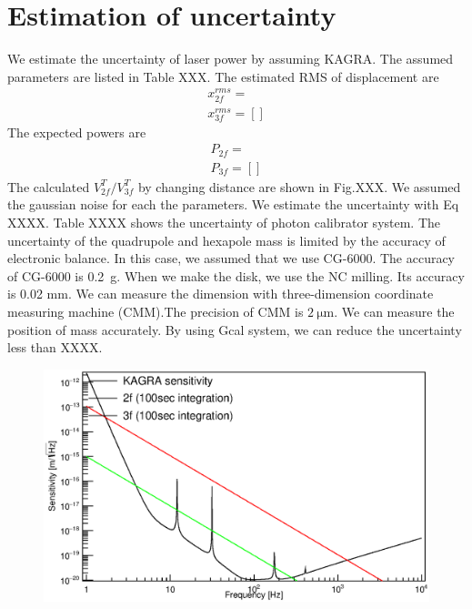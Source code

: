 \documentclass[12pt]{iopart}
\begin{document}
\section{Estimation of uncertainty}
We estimate the uncertainty of laser power by assuming KAGRA. The assumed parameters are listed in Table XXX. The estimated RMS of displacement are 
\begin{eqnarray}
x^{rms}_{2f}=\\
x^{rms}_{3f}= []
\end{eqnarray}
The expected powers are
\begin{eqnarray}
P_{2f}=\\
P_{3f}= []
\end{eqnarray}
The calculated $V^T_{2f}/V^{T}_{3f}$ by changing distance are shown in Fig.XXX.
We assumed the gaussian noise for each the parameters. We estimate the uncertainty with Eq XXXX. Table XXXX shows the uncertainty of  photon calibrator system. The uncertainty of the quadrupole and hexapole mass is limited by the accuracy of electronic balance. In this case, we assumed that we use CG-6000. The accuracy of CG-6000 is 0.2~g. When we make the disk, we use the NC milling. Its accuracy is 0.02 mm. We can measure the dimension with three-dimension coordinate measuring machine (CMM).The precision of CMM is $2~\mathrm{\mu m}$. We can measure the position of mass accurately. By using Gcal system, we can reduce the uncertainty less than XXXX.
\begin{figure}
\begin{center}
\includegraphics[width=12cm]{peaks.eps}
\caption{}
\label{fig:peaks}
\end{center}
\end{figure}
\end{document}
